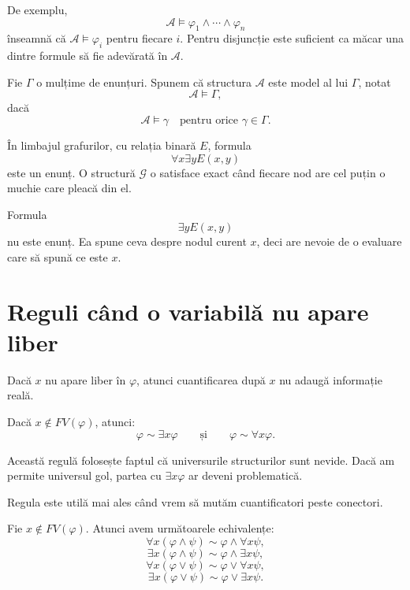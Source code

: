 \begin{note}
	De exemplu,
	\[
		\mathcal{A} \models \varphi_1 \land \cdots \land \varphi_n
	\]
	înseamnă că \( \mathcal{A} \models \varphi_i \) pentru fiecare \(i\). Pentru disjuncție este suficient ca măcar una dintre formule să fie adevărată în \( \mathcal{A} \).
\end{note}

\begin{definition}
	Fie \( \Gamma \) o mulțime de enunțuri. Spunem că structura \( \mathcal{A} \) este model al lui \( \Gamma \), notat
	\[
		\mathcal{A} \models \Gamma,
	\]
	dacă
	\[
		\mathcal{A} \models \gamma
		\quad \text{pentru orice } \gamma \in \Gamma.
	\]
\end{definition}


\begin{eg}
	În limbajul grafurilor, cu relația binară \(E\), formula
	\[
		\forall x \exists y E(x,y)
	\]
	este un enunț. O structură \( \mathcal{G} \) o satisface exact când fiecare nod are cel puțin o muchie care pleacă din el.

	Formula
	\[
		\exists y E(x,y)
	\]
	nu este enunț. Ea spune ceva despre nodul curent \(x\), deci are nevoie de o evaluare care să spună ce este \(x\).
\end{eg}

\section{Reguli când o variabilă nu apare liber}

Dacă \(x\) nu apare liber în \( \varphi \), atunci cuantificarea după \(x\) nu adaugă informație reală.

\begin{prop}
	Dacă \(x \notin FV(\varphi)\), atunci:
	\[
		\varphi \sim \exists x \varphi
		\qquad \text{și} \qquad
		\varphi \sim \forall x \varphi.
	\]
\end{prop}

\begin{note}
	Această regulă folosește faptul că universurile structurilor sunt nevide. Dacă am permite universul gol, partea cu \( \exists x \varphi \) ar deveni problematică.
\end{note}

Regula este utilă mai ales când vrem să mutăm cuantificatori peste conectori.

\begin{prop}
	Fie \(x \notin FV(\varphi)\). Atunci avem următoarele echivalențe:
	\[
		\forall x(\varphi \land \psi) \sim \varphi \land \forall x\psi,
	\]
	\[
		\exists x(\varphi \land \psi) \sim \varphi \land \exists x\psi,
	\]
	\[
		\forall x(\varphi \lor \psi) \sim \varphi \lor \forall x\psi,
	\]
	\[
		\exists x(\varphi \lor \psi) \sim \varphi \lor \exists x\psi.
	\]
\end{prop}

